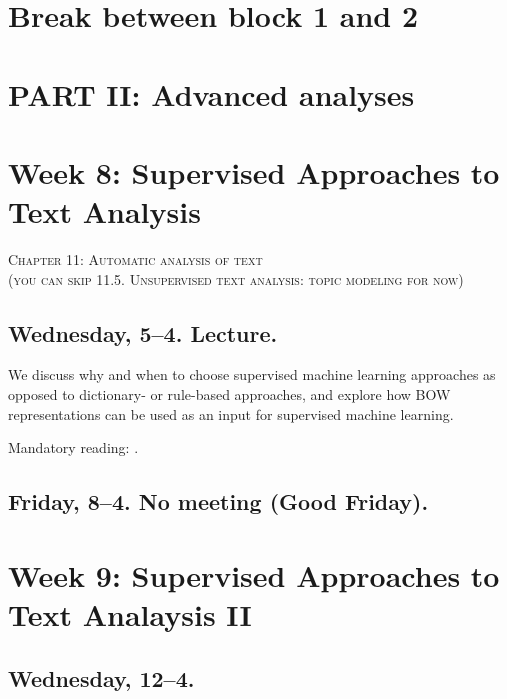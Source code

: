\section*{Break between block 1 and 2}




\section*{PART II: Advanced analyses}


\section*{Week 8: Supervised Approaches to Text Analysis}
\textsc{ Chapter 11: Automatic analysis of text}\\
\textsc{ (you can skip 11.5. Unsupervised text analysis: topic modeling for now)}\\


\subsection*{Wednesday, 5--4. Lecture.}

We discuss why and when to choose supervised machine learning approaches as opposed to dictionary- or rule-based approaches, and explore how BOW representations can be used as an input for supervised machine learning.

Mandatory reading: \cite{Boumans2016}.

\subsection*{Friday, 8--4. No meeting (Good Friday).}




\section*{Week 9: Supervised Approaches to Text Analaysis II}

\subsection*{Wednesday, 12--4.}

